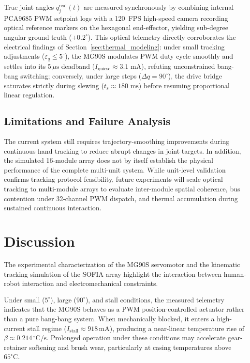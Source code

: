 \documentclass[lettersize,journal]{IEEEtran}
\begin{document}
	True joint angles $q_j^{\text{real}}(t)$ are measured synchronously by
	combining internal PCA9685 PWM setpoint logs with a 120~FPS high-speed
	camera recording optical reference markers on the hexagonal end-effector,
	yielding sub-degree angular ground truth ($\pm 0.2^\circ$). This optical
	telemetry directly corroborates the electrical findings of Section~\ref{sec:thermal_modeling}:
	under small tracking adjustments ($\varepsilon_q \le 5^\circ$), the MG90S
	modulates PWM duty cycle smoothly and settles into its $5\,\mu\text{s}$ deadband
	($I_{\text{quiesc}} \approx 3.1\text{ mA}$), refuting unconstrained bang-bang
	switching; conversely, under large steps ($\Delta q = 90^\circ$), the drive bridge
	saturates strictly during slewing ($t_s \approx 180\text{ ms}$) before resuming
	proportional linear regulation.
	
	\subsection{Limitations and Failure Analysis}
	\label{sec:limitations}
	
	The current system still requires trajectory-smoothing improvements
	during continuous hand tracking to reduce abrupt changes in joint
	targets. In addition, the simulated 16-module array does not by
	itself establish the physical performance of the complete multi-unit system.
	While unit-level validation confirms tracking protocol feasibility,
	future experiments will scale optical tracking to multi-module arrays to
	evaluate inter-module spatial coherence, bus contention under 32-channel PWM
	dispatch, and thermal accumulation during sustained continuous interaction.
	
	
	\section{Discussion}
	\label{sec:discussion}
	
	The experimental characterization of the MG90S
	servomotor and the kinematic tracking simulation of the SOFIA array
	highlight the interaction between human-robot interaction and
	electromechanical constraints.
	
	Under small ($5^\circ$), large ($90^\circ$),
	and stall conditions, the measured telemetry indicates that the
	MG90S behaves as a PWM position-controlled actuator rather than a
	pure bang-bang system. When mechanically blocked, it enters a
	high-current stall regime ($I_{\text{stall}} \approx 918\,\text{mA}$),
	producing a near-linear temperature rise of
	$\beta \approx 0.214\,^\circ\text{C/s}$.
	Prolonged operation under these conditions
	may accelerate gear-retainer softening and brush wear, particularly
	at casing temperatures above $65^\circ\text{C}$.
	
\end{document}
